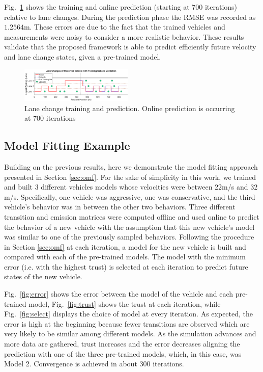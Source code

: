 \documentclass[letterpaper, 10 pt, conference]{ieeeconf}  %
\begin{document}
Fig.~\ref{fig:train2} shows the training and online prediction (starting at 700 iterations) relative to lane changes. During the prediction phase the RMSE was recorded as $1.2564$m. These errors are due to the fact that the trained vehicles and measurements were noisy to consider a more realistic behavior. These results validate that the proposed framework is able to predict efficiently future velocity and lane change states, given a pre-trained model.

\begin{figure}[ht]
\includegraphics[width=0.48\textwidth]{fig/train2.png}
 \vspace{-10pt}
\caption{Lane change training and prediction. Online prediction is occurring at 700 iterations} \label{fig:train2}
\end{figure}
	\vspace{-10pt}
\subsection{Model Fitting Example}

Building on the previous results, here we demonstrate the model fitting approach presented in Section \ref{sec:omf}. For the sake of simplicity in this work, we trained and built 3 different vehicles models whose velocities were between $22$m/s and $32$m/s. Specifically, one vehicle was aggressive, one was conservative, and the third vehicle's behavior was in between the other two behaviors. Three different transition and emission matrices were computed offline and used online to predict the behavior of a new vehicle with the assumption that this new vehicle's model was similar to one of the previously sampled behaviors. Following the procedure in Section \ref{sec:omf} at each iteration, a model for the new vehicle is built and compared with each of the pre-trained models. The model with the minimum error (i.e. with the highest trust) is selected at each iteration to predict future states of the new vehicle.

Fig.~\ref{fig:error} shows the error between the model of the vehicle and each pre-trained model, Fig.~\ref{fig:trust} shows the trust at each iteration, while Fig.~\ref{fig:select} displays the choice of model at every iteration. As expected, the error is high at the beginning because fewer transitions are observed which are very likely to be similar among different models. As the simulation advances and more data are gathered, trust increases and the error decreases aligning the prediction with one of the three pre-trained models, which, in this case, was Model 2. Convergence is achieved in about 300 iterations.  
\end{document}
